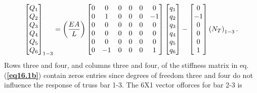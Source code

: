 \documentclass{AeroStructure-ERJohnson}
\begin{document}
\begin{example}
\begin{align}
\left[\begin{array}{@{}l@{}}Q_{1} \\Q_{2} \\Q_{3} \\Q_{4} \\Q_{5} \\Q_{6}\end{array}\right]_{1-3} = \left(\frac{EA}{L}\right)\left[\begin{array}{@{}cccccc@{}}0 & 0 & 0 & 0 & 0 & 0 \\0 & 1 & 0 & 0 & 0 & -1 \\0 & 0 & 0 & 0 & 0 & 0 \\0 & 0 & 0 & 0 & 0 & 0 \\0 & 0 & 0 & 0 & 0 & 0 \\0 & -1 & 0 & 0 & 0 & 1\end{array}\right]\left[\begin{array}{@{}c@{}}q_{1} \\q_{2} \\q_{3} \\q_{4} \\q_{5} \\q_{6}\end{array}\right]-\left[\begin{array}{@{}c@{}}0 \\-1 \\0 \\0 \\0 \\1\end{array}\right]\left(N_{T}\right)_{1-3}.
\end{align}
Rows three and four, and columns three and four, of the stiffness matrix in eq. (\textbf{\ref{eq16.1b}}) contain zeros entries since degrees of freedom three and four do not influence the response of truss bar 1-3. The 6X1 vector of\break forces for bar 2-3 is
\begin{align}\label{eq16.1c}\tag{c}

\end{align}
\end{example}
\end{document}
